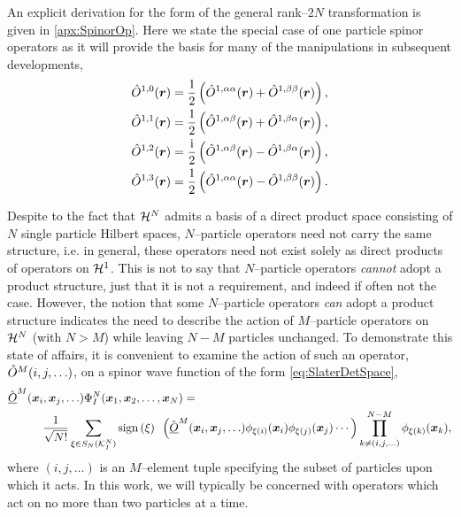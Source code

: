 An explicit derivation for the form of the general rank--$2N$ transformation is given in \cref{apx:SpinorOp}. Here we state the special case of
one particle spinor operators as it will provide the basis for many of the manipulations in subsequent developments,
\begin{subequations}
\begin{align}
&\hat{O}^{1,0}(\boldsymbol{r}) = \frac{1}{2} \left( \hat{O}^{1,\alpha\alpha}(\boldsymbol{r}) + \hat{O}^{1,\beta\beta}(\boldsymbol{r}) \right),\\
&\hat{O}^{1,1}(\boldsymbol{r}) = \frac{1}{2} \left( \hat{O}^{1,\alpha\beta}(\boldsymbol{r}) + \hat{O}^{1,\beta\alpha}(\boldsymbol{r}) \right),\\
&\hat{O}^{1,2}(\boldsymbol{r}) = \frac{\mathrm i}{2} \left( \hat{O}^{1,\alpha\beta}(\boldsymbol{r}) - \hat{O}^{1,\beta\alpha}(\boldsymbol{r}) \right),\\
&\hat{O}^{1,3}(\boldsymbol{r}) = \frac{1}{2} \left( \hat{O}^{1,\alpha\alpha}(\boldsymbol{r}) - \hat{O}^{1,\beta\beta}(\boldsymbol{r}) \right).
\end{align}
\end{subequations}



Despite to the fact that $\mathcal{H}^N$ admits a basis of a direct product space consisting of $N$ single particle
Hilbert spaces, $N$--particle operators need not carry the same structure, 
i.e. in general, these operators need not exist solely as direct products of operators on $\mathcal{H}^1$. This is not to say
that $N$--particle operators \emph{cannot} adopt a product structure, just that it is not a requirement, and indeed
if often not the case. However, the notion that some $N$--particle operators \emph{can} adopt a product structure indicates the need
to describe the action of $M$--particle operators on $\mathcal{H}^N$ (with $N>M$) while leaving $N-M$ particles unchanged.
To demonstrate this state of affairs, it is convenient to examine the action of such an operator, $\hat{O}^M(i,j,\ldots)$, on a 
spinor wave function of the form \cref{eq:SlaterDetSpace},
\begin{align}
  \label{eq:MOpSpace}
  &\hat{\underline{O}}^M(\boldsymbol{x}_i,\boldsymbol{x}_j,\ldots) \Phi_I^N(\boldsymbol{x}_1,\boldsymbol{x}_2,\ldots,\boldsymbol{x}_N) = \nonumber \\ &\qquad \quad
    \frac{1}{\sqrt{N!}} \sum_{\xi \in S_N(\mathcal{K}^N_I)} \mathrm{sign}\left( \xi \right) \text{ } 
    \left(\hat{\underline{O}}^M(\boldsymbol{x}_i,\boldsymbol{x}_j,\ldots) \phi_{\xi(i)}(\boldsymbol{x}_i)\phi_{\xi(j)}(\boldsymbol{x}_j)\cdots\right)
    \prod_{k \neq (i,j,\ldots) }^{N-M} \phi_{\xi(k)}(\boldsymbol{x}_k),
\end{align}
where $(i,j,\ldots)$ is an $M$--element tuple specifying the subset of particles upon which it acts.
In this work, we will typically be concerned with operators which act on no more than two particles at a time.

